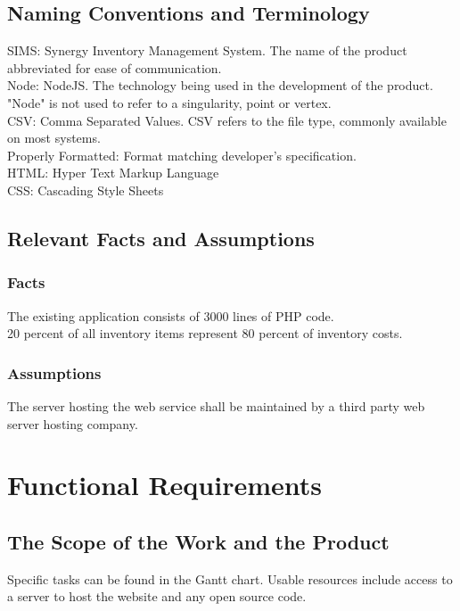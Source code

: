 \documentclass[12pt, titlepage]{article}
\begin{document}
\subsection{Naming Conventions and Terminology}
\noindent
SIMS: Synergy Inventory Management System. The name of the product abbreviated for ease of communication.\\
Node: NodeJS. The technology being used in the development of the product. "Node" is not used to refer to a singularity, point or vertex.\\
CSV: Comma Separated Values. CSV refers to the file type, commonly available on most systems.\\
Properly Formatted: Format matching developer's specification.\\
HTML: Hyper Text Markup Language\\
CSS: Cascading Style Sheets\\

\subsection{Relevant Facts and Assumptions}
\subsubsection*{Facts}
The existing application consists of 3000 lines of PHP code.\\
20 percent of all inventory items represent 80 percent of inventory costs.\\


\subsubsection*{Assumptions}
The server hosting the web service shall be maintained by a third party web server hosting company. \\
\section{Functional Requirements}

\subsection{The Scope of the Work and the Product}
Specific tasks can be found in the Gantt chart.
Usable resources include access to a server to host the website and any open source code.
\newpage
\end{document}
